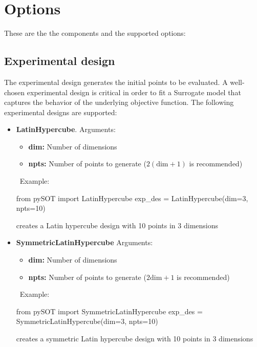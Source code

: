 \documentclass[]{article}
\begin{document}
\section{Options}
These are the the components and the supported options:
\subsection{Experimental design} 
\label{expdes}
The experimental design generates the initial points to be evaluated. A well-chosen experimental design is critical in order to fit a Surrogate model that captures the behavior of the underlying objective function. The following experimental designs are supported:
\begin{itemize}
\item \textbf{LatinHypercube}. Arguments:
\begin{itemize}
\item \textbf{dim:} Number of dimensions
\item \textbf{npts:} Number of points to generate ($2( \text{dim}+1)$ is recommended)
\end{itemize} 
\ \newline Example: 
\begin{python}
from pySOT import LatinHypercube
exp_des = LatinHypercube(dim=3, npts=10)
\end{python}
creates a Latin hypercube design with 10 points in 3 dimensions
\item \textbf{SymmetricLatinHypercube} Arguments:
\begin{itemize}
\item \textbf{dim:} Number of dimensions
\item \textbf{npts:} Number of points to generate ($2 \text{dim}+1$ is recommended)
\end{itemize}
\ \newline Example: 
\begin{python}
from pySOT import SymmetricLatinHypercube
exp_des = SymmetricLatinHypercube(dim=3, npts=10)
\end{python}
creates a symmetric Latin hypercube design with 10 points in 3 dimensions

\end{itemize}
\end{document}
